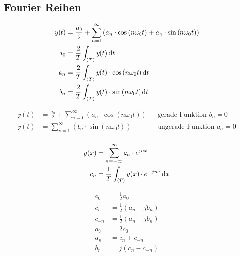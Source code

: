 \subsection{Fourier Reihen}

\begin{boxleft}
\end{boxleft}\begin{boxrightshaded}
\begin{align*}
y(t)&=\frac{a_0}{2}+\sum_{n=1}^\infty\left(a_n\cdot\cos\left(n\omega_0 t\right)+a_n\cdot\sin\left(n\omega_0 t\right)\right)\\
a_0&=\frac{2}{T}\int_{(T)}y(t)\mathop{}\!\mathrm{d} t\\
a_n&=\frac{2}{T}\int_{(T)}y(t)\cdot\cos\left(n\omega_0 t\right)\mathop{}\!\mathrm{d} t\\
b_n&=\frac{2}{T}\int_{(T)}y(t)\cdot\sin\left(n\omega_0 t\right)\mathop{}\!\mathrm{d} t
\end{align*}
\end{boxrightshaded}


\begin{boxleft}
\end{boxleft}\begin{boxrightshaded}
\begin{align*}
y(t)&=\frac{a_0}{2}+\sum_{n=1}^\infty\left(a_n\cdot\cos\left(n\omega_0 t\right)\right)&&\text{gerade Funktion $b_n=0$}\\
y(t)&=\sum_{n=1}^\infty\left(b_n\cdot\sin\left(n\omega_0 t\right)\right)&&\text{ungerade Funktion $a_n=0$}\\
\end{align*}
\end{boxrightshaded}

\begin{boxleft}
\end{boxleft}\begin{boxrightshaded}
\begin{align*}
y(x)&=\sum_{n=-\infty}^\infty c_n\cdot e^{jnx}\\
c_n&=\frac{1}{T}\int_{(T)}y(x)\cdot e^{-jnx}\mathop{}\!\mathrm{d} x
\end{align*}
\end{boxrightshaded}

\begin{boxleft}
\end{boxleft}\begin{boxrightshaded}
\begin{align*}
c_0&=\frac{1}{2}a_0\\
c_n&=\frac{1}{2}\left(a_n-jb_n\right)\\
c_{-n}&=\frac{1}{2}\left(a_n+jb_n\right)\\
a_0&=2c_0\\
a_n&=c_n+c_{-n}\\
b_n&=j\left(c_n-c_{-n}\right)
\end{align*}
\end{boxrightshaded}
